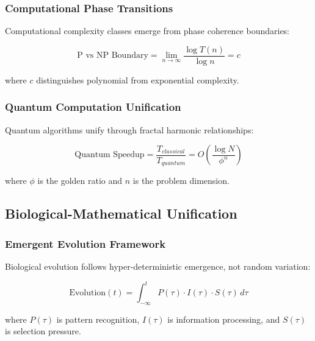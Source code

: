 \subsubsection{Computational Phase Transitions}

\begin{theorem}
Computational complexity classes emerge from phase coherence boundaries:

\begin{equation}
\text{P vs NP Boundary} = \lim_{n \to \infty} \frac{\log T(n)}{\log n} = c
\end{equation}

where $c$ distinguishes polynomial from exponential complexity.
\end{theorem}

\subsubsection{Quantum Computation Unification}

\begin{theorem}
Quantum algorithms unify through fractal harmonic relationships:

\begin{equation}
\text{Quantum Speedup} = \frac{T_{classical}}{T_{quantum}} = O\left( \frac{\log N}{\phi^n} \right)
\end{equation}

where $\phi$ is the golden ratio and $n$ is the problem dimension.
\end{theorem}

\subsection{Biological-Mathematical Unification}

\subsubsection{Emergent Evolution Framework}

\begin{theorem}
Biological evolution follows hyper-deterministic emergence, not random variation:

\begin{equation}
\text{Evolution}(t) = \int_{-\infty}^{t} P(\tau) \cdot I(\tau) \cdot S(\tau) \, d\tau
\end{equation}

where $P(\tau)$ is pattern recognition, $I(\tau)$ is information processing, and $S(\tau)$ is selection pressure.
\end{theorem}

